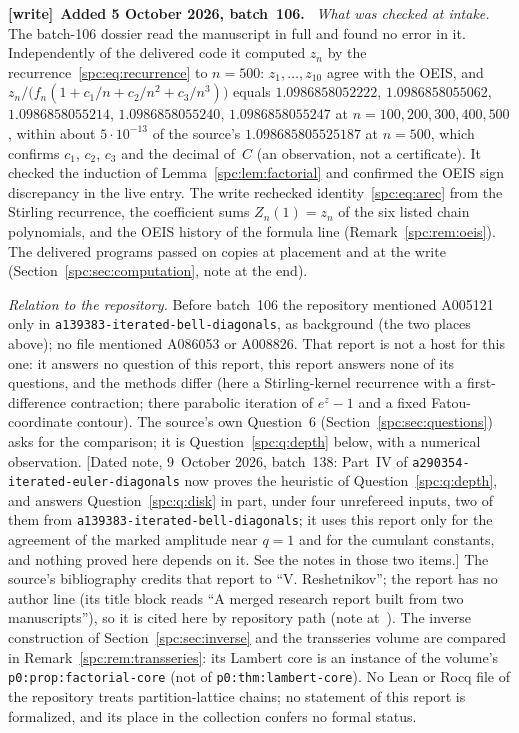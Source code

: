 \documentclass[11pt,letterpaper]{article}
\theoremstyle{definition}\newtheorem{definition}[theorem]{Definition}
\theoremstyle{remark}\newtheorem{remark}[theorem]{Remark}
\newcommand{\file}[1]{\nolinkurl{#1}}
\newenvironment{writenote}[1][]{\par\smallskip\begingroup\small
 \noindent\textbf{[write]}\if\relax\detokenize{#1}\relax\else~\textbf{#1.}\fi\ }%
 {\par\endgroup\smallskip}
\begin{document}
\begin{writenote}[Added 5 October 2026, batch~106]
\emph{What was checked at intake.} The batch-106 dossier read the manuscript
in full and found no error in it. Independently of the delivered code it
computed $z_n$ by the recurrence~\eqref{spc:eq:recurrence} to $n=500$:
$z_1,\dots,z_{10}$ agree with the OEIS, and
$z_n/\bigl(f_n(1+c_1/n+c_2/n^2+c_3/n^3)\bigr)$ equals
$1.0986858052222$, $1.0986858055062$, $1.0986858055214$,
$1.0986858055240$, $1.0986858055247$ at $n=100,200,300,400,500$, within
about $5\cdot10^{-13}$ of the source's $1.098685805525187$ at $n=500$, which
confirms $c_1$, $c_2$, $c_3$ and the decimal of~$C$ (an observation, not a
certificate). It checked the induction of Lemma~\ref{spc:lem:factorial} and
confirmed the OEIS sign discrepancy in the live entry. The write rechecked
identity~\eqref{spc:eq:arec} from the Stirling recurrence, the coefficient
sums $Z_n(1)=z_n$ of the six listed chain polynomials, and the OEIS history
of the formula line (Remark~\ref{spc:rem:oeis}). The delivered programs
passed on copies at placement and at the write
(Section~\ref{spc:sec:computation}, note at the end).

\emph{Relation to the repository.} Before batch~106 the repository mentioned
A005121 only in \file{a139383-iterated-bell-diagonals}, as background (the
two places above); no file mentioned A086053 or A008826. That report is not
a host for this one: it answers no question of this report, this report
answers none of its questions, and the methods differ (here a Stirling-kernel
recurrence with a first-difference contraction; there parabolic iteration of
$e^z-1$ and a fixed Fatou-coordinate contour). The source's own
Question~6 (Section~\ref{spc:sec:questions}) asks for the comparison; it is
Question~\ref{spc:q:depth} below, with a numerical observation.
\textup{[Dated note, 9~October 2026, batch~138: Part~IV of
\file{a290354-iterated-euler-diagonals} now proves the heuristic of
Question~\ref{spc:q:depth}, and answers Question~\ref{spc:q:disk} in part,
under four unrefereed inputs, two of them from
\file{a139383-iterated-bell-diagonals}; it uses this report only for the
agreement of the marked amplitude near $q=1$ and for the cumulant constants,
and nothing proved here depends on it. See the notes in those two items.]}
The source's
bibliography credits that report to ``V. Reshetnikov''; the report has no
author line (its title block reads ``A merged research report built from two
manuscripts''), so it is cited here by repository path
(note at~\cite{ProveItBell}). The inverse construction of
Section~\ref{spc:sec:inverse} and the transseries volume are compared in
Remark~\ref{spc:rem:transseries}: its Lambert core is an instance of the
volume's \file{p0:prop:factorial-core} (not of \file{p0:thm:lambert-core}).
No Lean or Rocq file of the repository treats partition-lattice chains; no
statement of this report is formalized, and its place in the collection
confers no formal status.
\end{writenote}
\end{document}
